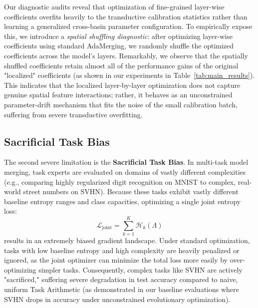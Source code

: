 Our diagnostic audits reveal that optimization of fine-grained layer-wise coefficients overfits heavily to the transductive calibration statistics rather than learning a generalized cross-basin parameter configuration. To empirically expose this, we introduce a \emph{spatial shuffling diagnostic}: after optimizing layer-wise coefficients using standard AdaMerging, we randomly shuffle the optimized coefficients across the model's layers. Remarkably, we observe that the spatially shuffled coefficients retain almost all of the performance gains of the original "localized" coefficients (as shown in our experiments in Table~\ref{tab:main_results}). This indicates that the localized layer-by-layer optimization does not capture genuine spatial feature interactions; rather, it behaves as an unconstrained parameter-drift mechanism that fits the noise of the small calibration batch, suffering from severe transductive overfitting.

\subsection{Sacrificial Task Bias}
The second severe limitation is the \textbf{Sacrificial Task Bias}. In multi-task model merging, task experts are evaluated on domains of vastly different complexities (e.g., comparing highly regularized digit recognition on MNIST to complex, real-world street numbers on SVHN). Because these tasks exhibit vastly different baseline entropy ranges and class capacities, optimizing a single joint entropy loss:
\begin{equation}
\mathcal{L}_{\text{joint}} = \sum_{k=1}^K \mathcal{H}_k(\Lambda)
\end{equation}
results in an extremely biased gradient landscape. Under standard optimization, tasks with low baseline entropy and high complexity are heavily penalized or ignored, as the joint optimizer can minimize the total loss more easily by over-optimizing simpler tasks. Consequently, complex tasks like SVHN are actively "sacrificed," suffering severe degradation in test accuracy compared to naive, uniform Task Arithmetic (as demonstrated in our baseline evaluations where SVHN drops in accuracy under unconstrained evolutionary optimization).

